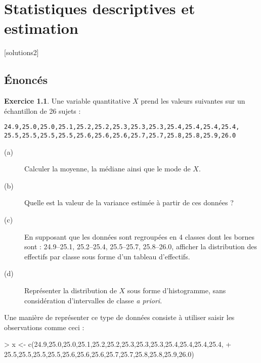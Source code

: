 \documentclass[11pt]{report}
\theoremstyle{definition}
\newtheorem{exo}{Exercice}[chapter]
\begin{document}

\chapter{Statistiques descriptives et estimation}\label{chap:descriptive}
[solutions2]


\section*{Énoncés}
%
%
%
\begin{exo}\label{exo:2.1}
Une variable quantitative $X$ prend les valeurs suivantes sur un échantillon
de 26 sujets :
\begin{verbatim}
24.9,25.0,25.0,25.1,25.2,25.2,25.3,25.3,25.3,25.4,25.4,25.4,25.4,
25.5,25.5,25.5,25.5,25.6,25.6,25.6,25.7,25.7,25.8,25.8,25.9,26.0
\end{verbatim}
\begin{description}
\item[(a)] Calculer la moyenne, la médiane ainsi que le mode de $X$. 
\item[(b)]  Quelle est la valeur de la variance estimée à partir de ces données ? 
\item[(c)] En supposant que les données sont regroupées en 4 classes dont les
  bornes sont : 24.9–25.1, 25.2–25.4, 25.5–25.7, 25.8–26.0, afficher la
  distribution des effectifs par classe sous forme d'un tableau d'effectifs. 
\item[(d)] Représenter la distribution de $X$ sous forme d'histogramme, sans
  considération d'intervalles de classe \emph{a priori}.
\end{description}
\begin{sol}
Une manière de représenter ce type de données consiste à utiliser saisir les
observations comme ceci :
\begin{Schunk}
\begin{Sinput}
> x <- c(24.9,25.0,25.0,25.1,25.2,25.2,25.3,25.3,25.3,25.4,25.4,25.4,25.4,
+        25.5,25.5,25.5,25.5,25.6,25.6,25.6,25.7,25.7,25.8,25.8,25.9,26.0)
\end{Sinput}
\end{Schunk}


\end{sol}
\end{exo}
\end{document}
